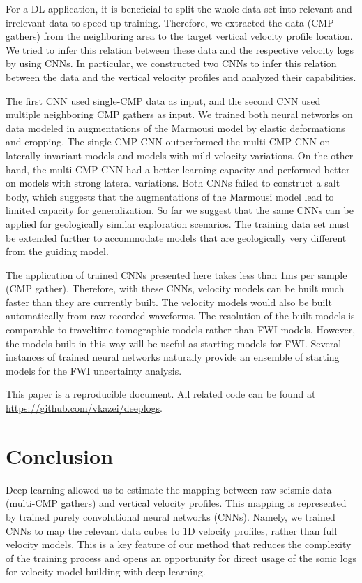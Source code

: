\documentclass[paper,twocolomn]{geophysics}
\begin{document}
For a DL application, it is beneficial to split the whole data set into relevant and irrelevant data to speed up training. Therefore, we extracted the data (CMP gathers) from the neighboring area to the target vertical velocity profile location. We tried to infer this relation between these data and the respective velocity logs by using CNNs. In particular, we constructed two CNNs to infer this relation between the data and the vertical velocity profiles and analyzed their capabilities.

The first CNN used single-CMP data as input, and the second CNN used multiple neighboring CMP gathers as input. We trained both neural networks on data modeled in augmentations of the Marmousi model by elastic deformations and cropping. The single-CMP CNN outperformed the multi-CMP CNN on laterally invariant models and models with mild velocity variations. On the other hand, the multi-CMP CNN had a better learning capacity and performed better on models with strong lateral variations. Both CNNs failed to construct a salt body, which suggests that the augmentations of the Marmousi model lead to limited capacity for generalization. So far we suggest that the same CNNs can be applied for geologically similar exploration scenarios. The training data set must be extended further to accommodate models that are geologically very different from the guiding model. 

The application of trained CNNs presented here takes less than 1ms per sample (CMP gather). Therefore, with these CNNs, velocity models can be built much faster than they are currently built. The velocity models would also be built automatically from raw recorded waveforms. The resolution of the built models is comparable to traveltime tomographic models rather than FWI models. However, the models built in this way will be useful as starting models for FWI. Several instances of trained neural networks naturally provide an ensemble of starting models for the FWI uncertainty analysis.

This paper is a reproducible document. All related code can be found at \\ \href{https://github.com/vkazei/deeplogs}{https://github.com/vkazei/deeplogs}.

\section{Conclusion}

Deep learning allowed us to estimate the mapping between raw seismic data (multi-CMP gathers) and vertical velocity profiles. This mapping is represented by trained purely convolutional neural networks (CNNs). Namely, we trained CNNs to map the relevant data cubes to 1D velocity profiles, rather than full velocity models. This is a key feature of our method that reduces the complexity of the training process and opens an opportunity for direct usage of the sonic logs for velocity-model building with deep learning.
 
\end{document}
